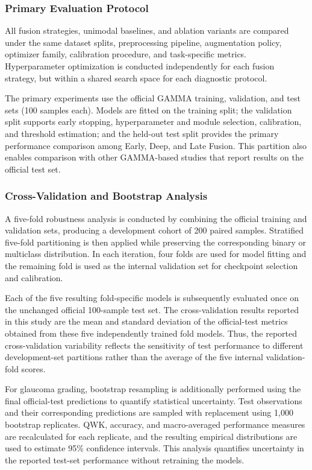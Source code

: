 \documentclass{ieeeaccess}
\begin{document}
\subsubsection{Primary Evaluation Protocol}
\label{subsubsec:official_split}

All fusion strategies, unimodal baselines, and ablation variants are compared under the same dataset splits, preprocessing pipeline, augmentation policy, optimizer family, calibration procedure, and task-specific metrics. Hyperparameter optimization is conducted independently for each fusion strategy, but within a shared search space for each diagnostic protocol.

The primary experiments use the official GAMMA training, validation, and test sets (100 samples each). Models are fitted on the training split; the validation split supports early stopping, hyperparameter and module selection, calibration, and threshold estimation; and the held-out test split provides the primary performance comparison among Early, Deep, and Late Fusion. This partition also enables comparison with other GAMMA-based studies that report results on the official test set.

\subsubsection{Cross-Validation and Bootstrap Analysis}
\label{subsubsec:robustness_analysis}

A five-fold robustness analysis is conducted by combining the official training and validation sets, producing a development cohort of 200 paired samples. Stratified five-fold partitioning is then applied while preserving the corresponding binary or multiclass distribution. In each iteration, four folds are used for model fitting and the remaining fold is used as the internal validation set for checkpoint selection and calibration.

Each of the five resulting fold-specific models is subsequently evaluated once on the unchanged official 100-sample test set. The cross-validation results reported in this study are the mean and standard deviation of the official-test metrics obtained from these five independently trained fold models. Thus, the reported cross-validation variability reflects the sensitivity of test performance to different development-set partitions rather than the average of the five internal validation-fold scores.

For glaucoma grading, bootstrap resampling is additionally performed using the final official-test predictions to quantify statistical uncertainty. Test observations and their corresponding predictions are sampled with replacement using 1,000 bootstrap replicates. QWK, accuracy, and macro-averaged performance measures are recalculated for each replicate, and the resulting empirical distributions are used to estimate 95\% confidence intervals. This analysis quantifies uncertainty in the reported test-set performance without retraining the models.
\end{document}
